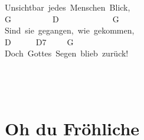 \documentclass[]{book}
\let\stdsection\section
\renewcommand\section{\clearpage\stdsection}
\begin{document}
Unsichtbar~jedes~Menschen~Blick,\\
\hspace*{0.333em}G~~~~~~~~~~D~~~~~~~~~~~~~G\\
Sind~sie~gegangen,~wie~gekommen,\\
\hspace*{0.333em}\hspace*{0.333em}\hspace*{0.333em}\hspace*{0.333em}\hspace*{0.333em}\hspace*{0.333em}\hspace*{0.333em}\hspace*{0.333em}\hspace*{0.333em}\hspace*{0.333em}\hspace*{0.333em}\hspace*{0.333em}\hspace*{0.333em}D~~~~~~D7~~~~~G\\
Doch~Gottes~Segen~blieb~zurück!\\
~\\
~\\
~\\

\hypertarget{oh-du-frohliche}{%
\section{Oh du Fröhliche}\label{oh-du-frohliche}}
\end{document}
